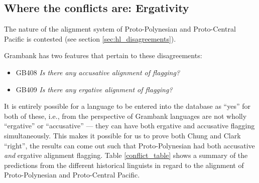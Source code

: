 \documentclass[12pt,letterpaper]{article}
\begin{document}





\FloatBarrier
\subsection{Where the conflicts are: Ergativity}
The nature of the alignment system of Proto-Polynesian and Proto-Central Pacific is contested (see section \ref{sec:hl_disagreements}).

Grambank has two features that pertain to these disagreements:

\begin{itemize}
\item GB408 \emph{Is there any accusative alignment of flagging?}
\item GB409 \emph{Is there any ergative alignment of flagging?}
\end{itemize}

It is entirely possible for a language to be entered into the database as ``yes'' for both of these, i.e., from the perspective of Grambank languages are not wholly ``ergative'' or ``accusative'' --- they can have both ergative and accusative flagging simultaneously. This makes it possible for us to prove both Chung and Clark ``right'', the results can come out such that Proto-Polynesian had both accusative \emph{and} ergative alignment flagging. Table \ref{conflict_table} shows a summary of the predictions from the different historical linguists in regard to the alignment of Proto-Polynesian and Proto-Central Pacific.

\newcommand{\pb}[1]{\parbox[t][][t]{1\linewidth}{#1} \vspace{3.5pt}}
\end{document}
